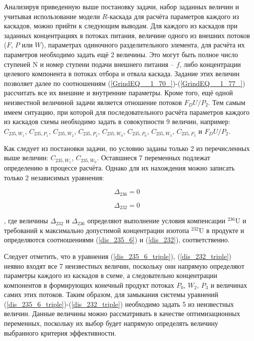 Анализируя приведенную выше постановку задачи, набор заданных величин и учитывая использование модели $R$-каскада для расчёта параметров каждого из каскадов, можно прийти к следующим выводам. Для каждого из каскадов при заданных концентрациях в потоках питания, величине одного из внешних потоков ($F$, $P$ или $W$), параметрах одиночного разделительного элемента, для расчёта их параметров необходимо задать ещё 2 величины. Это могут быть полное число ступеней N и номер ступени подачи внешнего питания -- $f$, либо концентрации целевого компонента в потоках отбора и отвала каскада. Задание этих величин позволяет далее по соотношениям (\ref{GrindEQ__1_70_})-(\ref{GrindEQ__1_77_}) рассчитать все их внешние и внутренние параметры. Кроме того, ещё одной неизвестной величиной задачи является отношение потоков ${F_DU}/{P_2}$.  Тем самым имеем ситуацию, при которой для последовательного расчёта параметров каждого из каскадов схемы необходимо задать в совокупности 9 величин, например: $C_{235,{W_1}}$, $C_{235,{P_1}}$, $C_{235,{W_2}}$, $C_{235,{P_2}}$, $C_{235,{W_0}}$, $C_{235,{P_0}}$, $C_{235,{W_3}}$, $C_{235,{P_3}}$ и ${F_DU}/{P_2}$. 

Как следует из постановки задачи, по условию заданы только 2 из перечисленных выше величин: $C_{235,{W_1}}$, $C_{235,{W_0}}$. Оставшиеся 7 переменных подлежат определению в процессе расчёта. Однако для их нахождения можно записать только 2 независимых уравнения:

\begin{equation}
    \label{dis_235_6_triple}
    \Delta_{236}=0
\end{equation}

\begin{equation}
    \label{dis_232_triple}
    \Delta_{232}=0
\end{equation}

, где величины $\Delta_{232}$ и $\Delta_{236}$ определяют выполнение условия компенсации $^{236}$U и требований к максимально допустимой концентрации изотопа $^{232}$U в продукте и определяются соотношениями (\ref{dis_235_6}) и (\ref{dis_232}), соответственно.

Следует отметить, что в уравнения (\ref{dis_235_6_triple}), (\ref{dis_232_triple}) неявно входят все 7 неизвестных величин, поскольку они напрямую определяют параметры каждого из каскадов в схеме, а следовательно концентрации компонентов в формирующих конечный продукт потоках $P_0$, $W_2$, $P_3$ и величинах самих этих потоков. Таким образом, для замыкания системы уравнений (\ref{dis_235_6_triple})-(\ref{dis_232_triple}) необходимо задать 5 из неизвестных величин. Данные величины можно рассматривать в качестве оптимизационных переменных, поскольку их выбор будет напрямую определять величину выбранного критерия эффективности.


